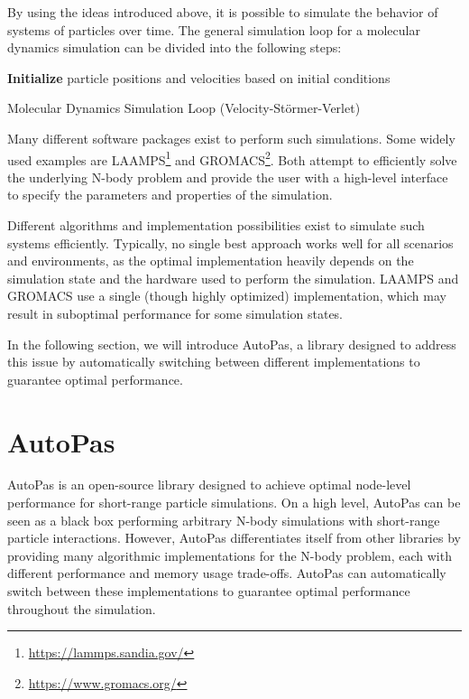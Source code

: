 By using the ideas introduced above, it is possible to simulate the behavior of systems of particles over time. The general simulation loop for a molecular dynamics simulation can be divided into the following steps:

\smallskip

\begin{algorithm}[H]
      \SetAlgoLined
      \textbf{Initialize} particle positions and velocities based on initial conditions\;
      \vspace{0.2cm}
      \caption{Molecular Dynamics Simulation Loop (Velocity-Störmer-Verlet)}
\end{algorithm}


Many different software packages exist to perform such simulations. Some widely used examples are LAAMPS\footnote{\url{https://lammps.sandia.gov/}} and GROMACS\footnote{\url{https://www.gromacs.org/}}. Both attempt to efficiently solve the underlying N-body problem and provide the user with a high-level interface to specify the parameters and properties of the simulation.

Different algorithms and implementation possibilities exist to simulate such systems efficiently. Typically, no single best approach works well for all scenarios and environments, as the optimal implementation heavily depends on the simulation state and the hardware used to perform the simulation. LAAMPS and GROMACS use a single (though highly optimized) implementation, which may result in suboptimal performance for some simulation states.

In the following section, we will introduce AutoPas, a library designed to address this issue by automatically switching between different implementations to guarantee optimal performance.

\section{AutoPas}

AutoPas is an open-source library designed to achieve optimal node-level performance for short-range particle simulations. On a high level, AutoPas can be seen as a black box performing arbitrary N-body simulations with short-range particle interactions. However, AutoPas differentiates itself from other libraries by providing many algorithmic implementations for the N-body problem, each with different performance and memory usage trade-offs. AutoPas can automatically switch between these implementations to guarantee optimal performance throughout the simulation.

